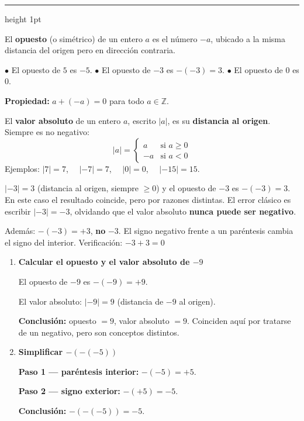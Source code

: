 \documentclass[11pt, letterpaper]{article}
\newcommand{\subbloque}[1]{%
  \vspace{14pt}
  \noindent{\large\bfseries\color{zenitnavy} #1}\par
  \vspace{4pt}\hrule height 1pt\vspace{8pt}}
\begin{document}
\subbloque{1.3 Opuesto y valor absoluto}
\label{sub:1.3}

\begin{tcolorbox}[importantbox, title={Opuesto de un n\'umero entero}]
El \textbf{opuesto} (o sim\'etrico) de un entero $a$ es el n\'umero $-a$, ubicado a la misma distancia del origen pero en direcci\'on contraria.

$\bullet$ El opuesto de $5$ es $-5$. \quad $\bullet$ El opuesto de $-3$ es $-(-3)=3$. \quad $\bullet$ El opuesto de $0$ es $0$.

\textbf{Propiedad:} $a+(-a)=0$ para todo $a\in\mathbb{Z}$.
\end{tcolorbox}

\begin{tcolorbox}[importantbox, title={Valor absoluto}]
El \textbf{valor absoluto} de un entero $a$, escrito $|a|$, es su \textbf{distancia al origen}. Siempre es no negativo:
$$|a| = \begin{cases} a & \text{si } a \geq 0 \\ -a & \text{si } a < 0 \end{cases}$$
Ejemplos: $|7|=7$, $\quad |-7|=7$, $\quad |0|=0$, $\quad |-15|=15$.
\end{tcolorbox}

\begin{tcolorbox}[warningbox, title={Error frecuente --- confundir opuesto con valor absoluto}]
$|-3|=3$ (distancia al origen, siempre $\geq 0$) y el opuesto de $-3$ es $-(-3)=3$. En este caso el resultado coincide, pero por razones distintas. El error cl\'asico es escribir $|-3|=-3$, olvidando que el valor absoluto \textbf{nunca puede ser negativo}.

Adem\'as: $-(-3)=+3$, \textbf{no} $-3$. El signo negativo frente a un par\'entesis cambia el signo del interior. Verificaci\'on: $-3+3=0$ \checkmark
\end{tcolorbox}

\begin{tcolorbox}[examplebox, title={Ejemplos --- opuesto y valor absoluto}]
\begin{enumerate}[label=\textbf{Ej. \arabic*.}, leftmargin=*, itemsep=12pt]

\item \textbf{Calcular el opuesto y el valor absoluto de $-9$}

El opuesto de $-9$ es $-(-9)=+9$.

El valor absoluto: $|-9|=9$ (distancia de $-9$ al origen).

\textbf{Conclusi\'on:} opuesto $=9$, valor absoluto $=9$. Coinciden aqu\'i por tratarse de un negativo, pero son conceptos distintos.

\item \textbf{Simplificar $-(-(-5))$}

\textbf{Paso 1 --- par\'entesis interior:} $-(-5)=+5$.

\textbf{Paso 2 --- signo exterior:} $-(+5)=-5$.

\textbf{Conclusi\'on:} $-(-(-5))=-5$.

\end{enumerate}
\end{tcolorbox}
\end{document}
